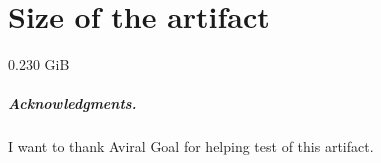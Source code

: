 \documentclass[a4paper,UKenglish]{darts-v2018}
\newcommand{\artifactsize}[1]{{\section{Size of the artifact}#1}}
\begin{document}
\artifactsize{0.230 GiB}

\subparagraph*{Acknowledgments.}

I want to thank Aviral Goal for helping test of this artifact.







\end{document}
